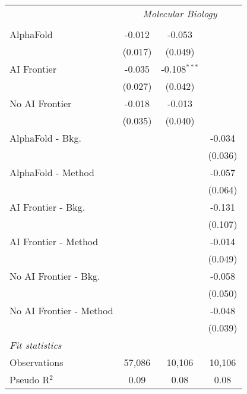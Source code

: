 \begin{tabular}{lccc}
 & \multicolumn{3}{c}{\textit{Molecular Biology}} \\ \\
   AlphaFold               & -0.012  & -0.053         &   \\   
                           & (0.017) & (0.049)        &   \\   
   AI Frontier             & -0.035  & -0.108$^{***}$ &   \\   
                           & (0.027) & (0.042)        &   \\   
   No AI Frontier          & -0.018  & -0.013         &   \\   
                           & (0.035) & (0.040)        &   \\   
   AlphaFold - Bkg.        &         &                & -0.034\\   
                           &         &                & (0.036)\\   
   AlphaFold - Method      &         &                & -0.057\\   
                           &         &                & (0.064)\\   
   AI Frontier - Bkg.      &         &                & -0.131\\   
                           &         &                & (0.107)\\   
   AI Frontier - Method    &         &                & -0.014\\   
                           &         &                & (0.049)\\   
   No AI Frontier - Bkg.   &         &                & -0.058\\   
                           &         &                & (0.050)\\   
   No AI Frontier - Method &         &                & -0.048\\   
                           &         &                & (0.039)\\   
   \midrule
   \emph{Fit statistics}\\
   Observations            & 57,086  & 10,106         & 10,106\\  
   Pseudo R$^2$            & 0.09    & 0.08           & 0.08\\  
   

\end{tabular}
